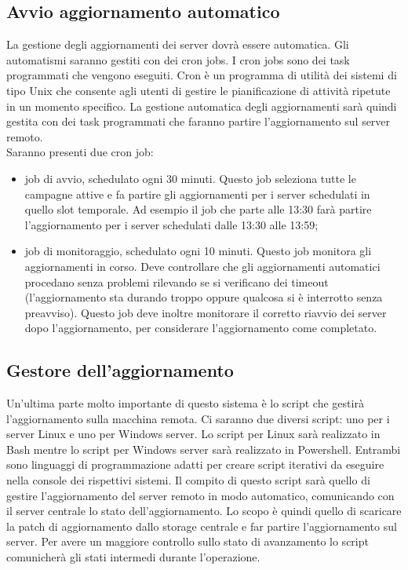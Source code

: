 \subsection{Avvio aggiornamento automatico}
La gestione degli aggiornamenti dei server dovrà essere automatica. 
Gli automatismi saranno gestiti con dei cron jobs. I cron jobs sono 
dei task programmati che vengono eseguiti. Cron è un programma di
utilità dei sistemi di tipo Unix che consente agli utenti di gestire 
le pianificazione di attività ripetute in un momento specifico.
La gestione automatica degli aggiornamenti sarà quindi gestita con 
dei task programmati che faranno partire l’aggiornamento sul server remoto.\\

Saranno presenti due cron job:
\begin{itemize}
\item job di avvio, schedulato ogni 30 minuti. Questo job seleziona tutte 
le campagne attive e fa partire gli aggiornamenti per i server schedulati 
in quello slot temporale. Ad esempio il job che parte alle 13:30 farà 
partire l’aggiornamento per i server schedulati dalle 13:30 alle 13:59; 
\item job di monitoraggio, schedulato ogni 10 minuti. Questo job monitora gli 
aggiornamenti in corso. Deve controllare che gli aggiornamenti automatici
procedano senza problemi rilevando se si verificano dei timeout 
(l’aggiornamento sta durando troppo oppure qualcosa si è interrotto 
senza preavviso). Questo job deve inoltre monitorare il corretto riavvio 
dei server dopo l’aggiornamento, per considerare l’aggiornamento 
come completato.
\end{itemize}


\subsection{Gestore dell’aggiornamento}
Un’ultima parte molto importante di questo sistema è lo script che gestirà 
l’aggiornamento sulla macchina remota. Ci saranno due diversi script: 
uno per i server Linux e uno per Windows server.
Lo script per Linux sarà realizzato in Bash mentre lo script per Windows 
server sarà realizzato in Powershell. Entrambi sono linguaggi di 
programmazione adatti per creare script iterativi da eseguire nella 
console dei rispettivi sistemi.
Il compito di questo script sarà quello di gestire l'aggiornamento del 
server remoto in modo automatico, comunicando con il server centrale lo 
stato dell’aggiornamento.
Lo scopo è quindi quello di scaricare la patch di aggiornamento dallo 
storage centrale e far partire l’aggiornamento sul server. Per avere un 
maggiore controllo sullo stato di avanzamento lo script comunicherà gli 
stati intermedi durante l’operazione.\\

